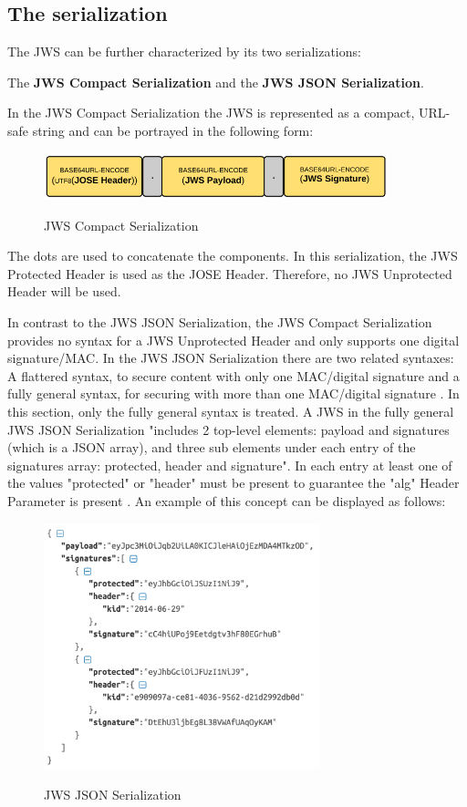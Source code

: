 \subsection{The serialization}
The JWS can be further characterized by its two serializations:\begin{center} The \textbf{JWS Compact Serialization} and the \textbf{JWS JSON Serialization}.\end{center}
In the JWS Compact Serialization the JWS is represented as a compact, URL-safe string \cite{rfc7515} and can be portrayed in the following form:
\begin{figure}
\centering
\includegraphics[width=10cm]{Pages/JWS/CompactSerialization.png}
\caption{JWS Compact Serialization}\cite{Compact}
\end{figure}

The dots are used to concatenate the components.
In this serialization, the JWS Protected Header is used as the JOSE Header. Therefore, no JWS Unprotected Header will be used.

In contrast to the JWS JSON Serialization, the JWS Compact Serialization provides no syntax for a JWS Unprotected Header and only supports one digital signature/MAC.
In the JWS JSON Serialization there are two related syntaxes: A flattered syntax, to secure content with only one MAC/digital signature and a fully general syntax, for securing with more than one MAC/digital signature \cite{rfc7515}. In this section, only the fully general syntax is treated. 
A JWS in the fully general JWS JSON Serialization "includes 2 top-level elements: payload and signatures (which is a JSON array), and three sub elements under each entry of the signatures array: protected, header and signature"\cite{Dummies}.
In each entry at least one of the values "protected" or "header" must be present to guarantee the "alg" Header Parameter is present \cite{rfc7515}.\newline
An example of this concept can be displayed as follows:\newline 
	\begin{figure}
\centering
\includegraphics[width=8cm]{Pages/JWS/JSONSerialization.png}
\caption{JWS JSON Serialization} \cite{JSON}
\end{figure}
